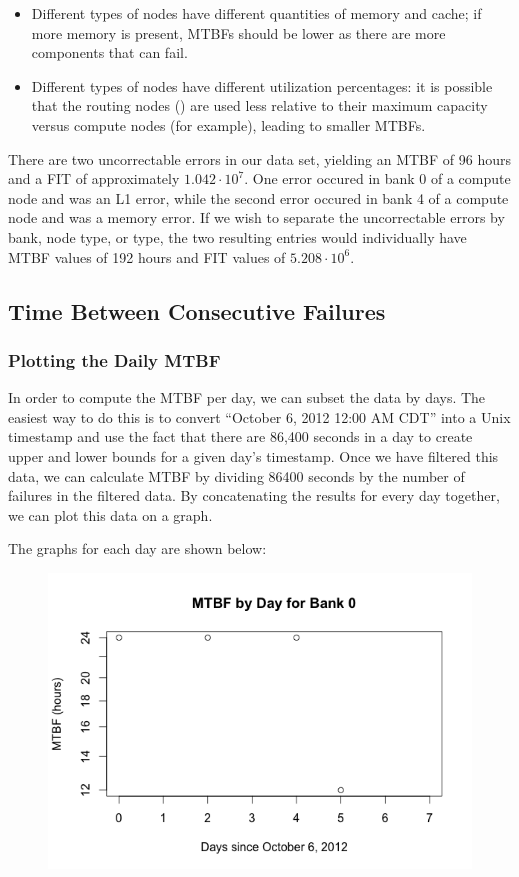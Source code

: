 \begin{itemize}
\item Different types of nodes have different quantities of memory and cache; if more memory is present, MTBFs should be lower as there are more components that can fail.
\item Different types of nodes have different utilization percentages: it is possible that the routing nodes () are used less relative to their maximum capacity versus compute nodes (for example), leading to smaller MTBFs.
\end{itemize}

There are two uncorrectable errors in our data set, yielding an MTBF of 96 hours and a FIT of approximately $1.042 \cdot 10^7$.  One error occured in bank 0 of a compute node and was an L1 error, while the second error occured in bank 4 of a compute node and was a memory error.  If we wish to separate the uncorrectable errors by bank, node type, or type, the two resulting entries would individually have MTBF values of 192 hours and FIT values of $5.208 \cdot 10^6$.

\subsection{Time Between Consecutive Failures}
\subsubsection{Plotting the Daily MTBF}

In order to compute the MTBF per day, we can subset the data by days.  The easiest way to do this is to convert ``October 6, 2012 12:00 AM CDT'' into a Unix timestamp and use the fact that there are 86,400 seconds in a day to create upper and lower bounds for a given day's timestamp.  Once we have filtered this data, we can calculate MTBF by dividing 86400 seconds by the number of failures in the filtered data.  By concatenating the results for every day together, we can plot this data on a graph.

The graphs for each day are shown below:

\begin{figure}[h]
\centering
\includegraphics{images/mtbf_0.png}
\end{figure}

